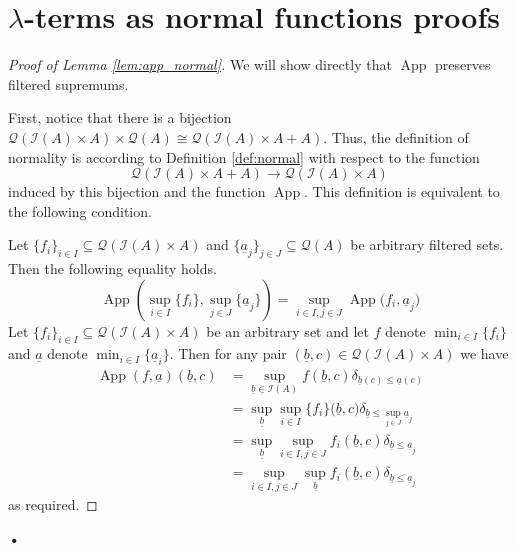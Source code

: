 \documentclass[runningheads]{llncs}
\newcommand{\call}[1]{\mathcal{#1}}
\newcommand{\Ical}{\call{I}}
\newcommand{\Qcal}{\call{Q}}
\newcommand{\lto}{\longrightarrow}
\begin{document}
\section{$\lambda$-terms as normal functions proofs}\label{ap:normal_functions}
\begin{proof}[Proof of Lemma \ref{lem:app_normal}]
		We will show directly that $\operatorname{App}$ preserves filtered supremums.
		
		First, notice that there is a bijection $\Qcal(\Ical(A) \times A) \times \Qcal(A) \cong \Qcal(\Ical(A) \times A + A)$. Thus, the definition of normality is according to Definition \ref{def:normal} with respect to the function
		\begin{equation}
			\Qcal(\Ical(A) \times A + A) \lto \Qcal(\Ical(A) \times A)
		\end{equation}
		induced by this bijection and the function $\operatorname{App}$. This definition is equivalent to the following condition.
		
			Let $\{ f_i \}_{i \in I} \subseteq \Qcal(\Ical(A) \times A)$ and $\{{ \underline{a}_j }\}_{j \in J} \subseteq \Qcal(A)$ be arbitrary filtered sets. Then the following equality holds.
			\begin{equation}
				\operatorname{App}(\operatorname{sup}_{i \in I}\{ f_i \}, \operatorname{sup}_{j \in J}\{ \underline{a}_j \}) = \operatorname{sup}_{i \in I, j \in J}\operatorname{App}\big(f_i, \underline{a}_j\big)
			\end{equation}
		Let $\{ f_i \}_{i \in I} \subseteq \Qcal(\Ical(A) \times A)$ be an arbitrary set and let $f$ denote $\operatorname{min}_{i \in I}\{ f_i \}$ and $\underline{a}$ denote $\operatorname{min}_{i \in I}\{ \underline{a}_i \}$. Then for any pair $(\underline{b}, c) \in \Qcal(\Ical(A) \times A)$ we have
		\begin{align*}
			\operatorname{App}(f,\underline{a})(\underline{b}, c) &= \operatorname{sup}_{\underline{b} \in \Ical(A)}f(\underline{b}, c)\delta_{\underline{b}(c) \leq \underline{a}(c)}\\
			&=\operatorname{sup}_{\underline{b}} \operatorname{sup}_{i \in I}\{ f_i \}\big(\underline{b}, c\big) \delta_{\underline{b} \leq \operatorname{sup}_{j \in J}\underline{a}_j}\\
			&= \operatorname{sup}_{
			\underline{b}}\operatorname{sup}_{i \in I, j \in J}f_i(\underline{b}, c)\delta_{\underline{b} \leq \underline{a}_j}\\
			&= \operatorname{sup}_{i \in I, j \in J}\operatorname{sup}_{
				\underline{b}}f_i(\underline{b}, c)\delta_{\underline{b} \leq \underline{a}_j}
		\end{align*}
		as required.
	\end{proof}\textbf{•}
\end{document}
